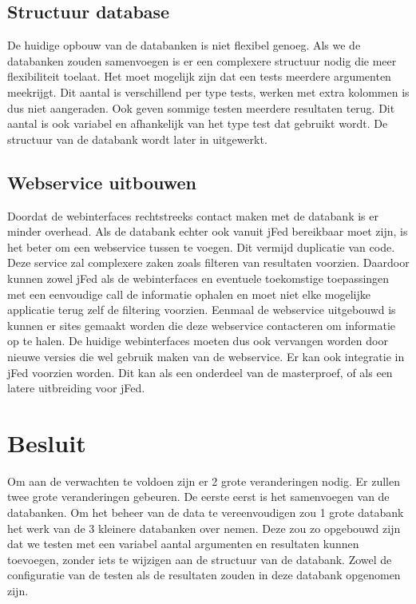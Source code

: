 \subsection{Structuur database}
\npar
De huidige opbouw van de databanken is niet flexibel genoeg. Als we de databanken zouden samenvoegen is er een complexere structuur nodig die meer flexibiliteit toelaat.
Het moet mogelijk zijn dat een tests meerdere argumenten meekrijgt. Dit aantal is verschillend per type tests, werken met extra kolommen is dus niet aangeraden.
Ook geven sommige testen meerdere resultaten terug. Dit aantal is ook variabel en afhankelijk van het type test dat gebruikt wordt.
De structuur van de databank wordt later in uitgewerkt.

\subsection{Webservice uitbouwen}
\npar
Doordat de webinterfaces rechtstreeks contact maken met de databank is er minder overhead. Als de databank echter ook vanuit jFed bereikbaar moet zijn, is het beter om een webservice tussen te voegen. Dit vermijd duplicatie van code. Deze service zal complexere zaken zoals filteren van resultaten voorzien. Daardoor kunnen zowel jFed als de webinterfaces en eventuele toekomstige toepassingen met een eenvoudige call de informatie ophalen en moet niet elke mogelijke applicatie terug zelf de filtering voorzien.
\npar
Eenmaal de webservice uitgebouwd is kunnen er sites gemaakt worden die deze webservice contacteren om informatie op te halen. De huidige webinterfaces moeten dus ook vervangen worden door nieuwe versies die wel gebruik maken van de webservice. Er kan ook integratie in jFed voorzien worden. Dit kan als een onderdeel van de masterproef, of als een latere uitbreiding voor jFed.

\section{Besluit}
\npar
Om aan de verwachten te voldoen zijn er 2 grote veranderingen nodig. 
Er zullen twee grote veranderingen gebeuren. De eerste eerst is het samenvoegen van de databanken. Om het beheer van de data te vereenvoudigen zou 1 grote databank het werk van de 3 kleinere databanken over nemen. Deze zou zo opgebouwd zijn dat we testen met een variabel aantal argumenten en resultaten kunnen toevoegen, zonder iets te wijzigen aan de structuur van de databank. Zowel de configuratie van de testen als de resultaten zouden in deze databank opgenomen zijn.